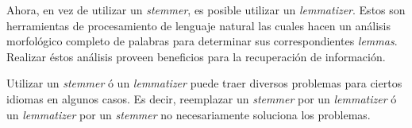 		Ahora, en vez de utilizar un \textit{stemmer}, es posible utilizar un \textit{lemmatizer}. Estos son herramientas de procesamiento de lenguaje natural las cuales hacen un análisis morfológico completo de palabras para determinar sus correspondientes \textit{lemmas}. Realizar éstos análisis proveen beneficios para la recuperación de información. \par
		
		Utilizar un \textit{stemmer} ó un \textit{lemmatizer} puede traer diversos problemas para ciertos idiomas en algunos casos. Es decir, reemplazar un \textit{stemmer} por un \textit{lemmatizer} ó un \textit{lemmatizer} por un \textit{stemmer} no necesariamente soluciona los problemas.
					